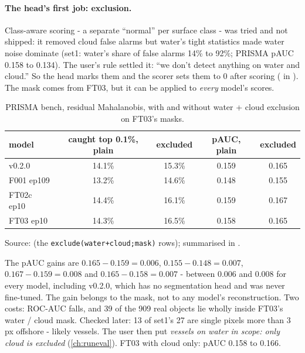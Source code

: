\paragraph{The head's first job: exclusion.} Class-aware scoring - a separate ``normal'' per surface class - was tried
and not shipped: it removed cloud false alarms but water's tight statistics made water noise dominate (set1: water's
share of false alarms 14\% to 92\%; PRISMA pAUC 0.158 to 0.134). The user's rule settled it: ``we don't detect
anything on water and cloud.'' So the head marks them and the scorer sets them to 0 after scoring ( in
). The mask comes from FT03, but it can be applied to \emph{every} model's scores.

\begin{table}[htbp]
\centering
\caption{PRISMA bench, residual Mahalanobis, with and without water + cloud exclusion on FT03's masks.}
\label{tab:ftruns:exclude}
\small
\begin{tabular}{lcccc}
\toprule
model & caught top 0.1\%, plain & excluded & pAUC, plain & excluded \\
\midrule
v0.2.0 & 14.1\% & 15.3\% & 0.159 & 0.165 \\
F001 ep109 & 13.2\% & 14.6\% & 0.148 & 0.155 \\
FT02c ep10 & 14.4\% & 16.1\% & 0.159 & 0.167 \\
FT03 ep10 & 14.3\% & 16.5\% & 0.158 & 0.165 \\
\bottomrule
\end{tabular}

\smallskip
{\footnotesize Source:  (the \texttt{exclude(water+cloud;mask)} rows); summarised in .}
\end{table}

The pAUC gains are $0.165 - 0.159 = 0.006$, $0.155 - 0.148 = 0.007$, $0.167 - 0.159 = 0.008$ and $0.165 - 0.158 =
0.007$ - between 0.006 and 0.008 for every model, including v0.2.0, which has no segmentation head and was never
fine-tuned. The gain belongs to the mask, not to any model's reconstruction. Two costs: ROC-AUC falls, and 39 of the
909 real objects lie wholly inside FT03's water / cloud mask. Checked later: 13 of set1's 27 are single pixels more
than 3\,px offshore - likely vessels. The user then put \emph{vessels on water in scope: only cloud is excluded}
(\cref{ch:runeval}). FT03 with cloud only: pAUC 0.158 to 0.166.

